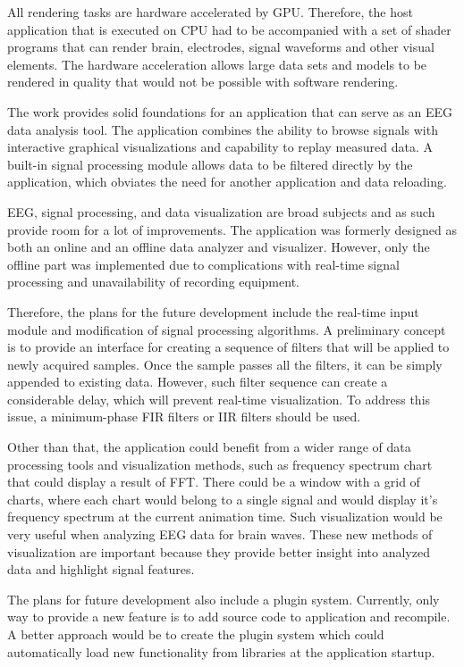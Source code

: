 All rendering tasks are hardware accelerated by GPU. Therefore, the host application that is executed on CPU had to be accompanied with a set of shader programs that can render brain, electrodes, signal waveforms and other visual elements. The hardware acceleration allows large data sets and models to be rendered in quality that would not be possible with software rendering.

The work provides solid foundations for an application that can serve as an EEG data analysis tool. The application combines the ability to browse signals with interactive graphical visualizations and capability to replay measured data. A built-in signal processing module allows data to be filtered directly by the application, which obviates the need for another application and data reloading.

EEG, signal processing, and data visualization are broad subjects and as such provide room for a lot of improvements. The application was formerly designed as both an online and an offline data analyzer and visualizer. However, only the offline part was implemented due to complications with real-time signal processing and unavailability of recording equipment.

Therefore, the plans for the future development include the real-time input module and modification of signal processing algorithms. A preliminary concept is to provide an interface for creating a sequence of filters that will be applied to newly acquired samples. Once the sample passes all the filters, it can be simply appended to existing data. However, such filter sequence can create a considerable delay, which will prevent real-time visualization. To address this issue, a minimum-phase FIR filters or IIR filters should be used.

Other than that, the application could benefit from a wider range of data processing tools and visualization methods, such as frequency spectrum chart that could display a result of FFT. There could be a window with a grid of charts, where each chart would belong to a single signal and would display it's frequency spectrum at the current animation time. Such visualization would be very useful when analyzing EEG data for brain waves. These new methods of visualization are important because they provide better insight into analyzed data and highlight signal features. 

The plans for future development also include a plugin system. Currently, only way to provide a new feature is to add source code to application and recompile. A better approach would be to create the plugin system which could automatically load new functionality from libraries at the application startup. 

